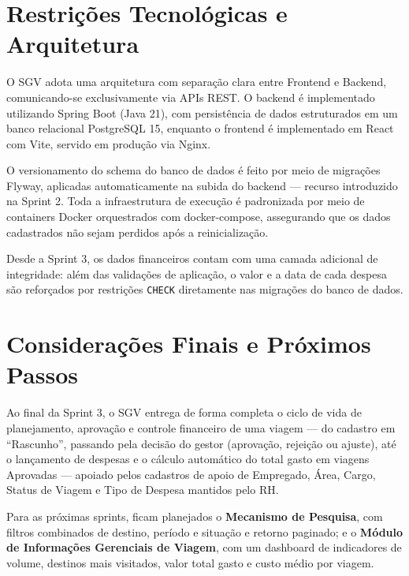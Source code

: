 \documentclass[12pt,article,oneside,a4paper]{abntex2}
\begin{document}
\section{Restrições Tecnológicas e Arquitetura}

O SGV adota uma arquitetura com separação clara entre Frontend e Backend,
comunicando-se exclusivamente via APIs REST. O backend é implementado
utilizando Spring Boot (Java 21), com persistência de dados estruturados em
um banco relacional PostgreSQL 15, enquanto o frontend é implementado em
React com Vite, servido em produção via Nginx.

O versionamento do schema do banco de dados é feito por meio de migrações
Flyway, aplicadas automaticamente na subida do backend --- recurso
introduzido na Sprint 2. Toda a infraestrutura de execução é padronizada por
meio de containers Docker orquestrados com docker-compose, assegurando que
os dados cadastrados não sejam perdidos após a reinicialização.

Desde a Sprint 3, os dados financeiros contam com uma camada adicional de
integridade: além das validações de aplicação, o valor e a data de cada
despesa são reforçados por restrições \texttt{CHECK} diretamente nas
migrações do banco de dados.

\section{Considerações Finais e Próximos Passos}

Ao final da Sprint 3, o SGV entrega de forma completa o ciclo de vida de
planejamento, aprovação e controle financeiro de uma viagem --- do cadastro
em ``Rascunho'', passando pela decisão do gestor (aprovação, rejeição ou
ajuste), até o lançamento de despesas e o cálculo automático do total gasto
em viagens Aprovadas --- apoiado pelos cadastros de apoio de Empregado,
Área, Cargo, Status de Viagem e Tipo de Despesa mantidos pelo RH.

Para as próximas sprints, ficam planejados o \textbf{Mecanismo de Pesquisa},
com filtros combinados de destino, período e situação e retorno paginado; e
o \textbf{Módulo de Informações Gerenciais de Viagem}, com um dashboard de
indicadores de volume, destinos mais visitados, valor total gasto e custo
médio por viagem.
\end{document}
